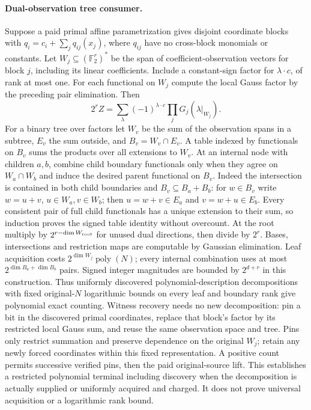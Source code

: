 \documentclass[11pt]{article}
\begin{document}
\paragraph{Dual-observation tree consumer.}
Suppose a paid primal affine parametrization gives disjoint coordinate blocks with
$q_i=c_i+\sum_jq_{ij}(x_j)$, where $q_{ij}$ have no cross-block monomials or constants. Let $W_j\subseteq(\mathbb F_2^r)^*$ be the span of coefficient-observation vectors for block $j$, including its linear coefficients. Include a constant-sign factor for $\lambda\cdot c$, of rank at most one. For each functional on $W_j$ compute the local Gauss factor by the preceding pair elimination. Then
\[
2^r Z=\sum_\lambda(-1)^{\lambda\cdot c}
\prod_j G_j(\lambda|_{W_j}).
\]
For a binary tree over factors let $W_v$ be the sum of the observation spans in a subtree, $E_v$ the sum outside, and $B_v=W_v\cap E_v$. A table indexed by functionals on $B_v$ sums the products over all extensions to $W_v$. At an internal node with children $a,b$, combine child boundary functionals only when they agree on $W_a\cap W_b$ and induce the desired parent functional on $B_v$. Indeed the intersection is contained in both child boundaries and $B_v\subseteq B_a+B_b$: for $w\in B_v$ write $w=u+v$, $u\in W_a,v\in W_b$; then $u=w+v\in E_a$ and $v=w+u\in E_b$. Every consistent pair of full child functionals has a unique extension to their sum, so induction proves the signed table identity without overcount. At the root multiply by $2^{r-\dim W_{\rm root}}$ for unused dual directions, then divide by $2^r$. Bases, intersections and restriction maps are computable by Gaussian elimination. Leaf acquisition costs $2^{\dim W_j}\operatorname{poly}(N)$; every internal combination uses at most $2^{\dim B_a+\dim B_b}$ pairs. Signed integer magnitudes are bounded by $2^{d+r}$ in this construction. Thus uniformly discovered polynomial-description decompositions with fixed original-$N$ logarithmic bounds on every leaf and boundary rank give polynomial exact counting. Witness recovery needs no new decomposition: pin a bit in the discovered primal coordinates, replace that block's factor by its restricted local Gauss sum, and reuse the same observation space and tree. Pins only restrict summation and preserve dependence on the original $W_j$; retain any newly forced coordinates within this fixed representation. A positive count permits successive verified pins, then the paid original-source lift. This establishes a restricted polynomial terminal including discovery when the decomposition is actually supplied or uniformly acquired and charged. It does not prove universal acquisition or a logarithmic rank bound.
\end{document}
